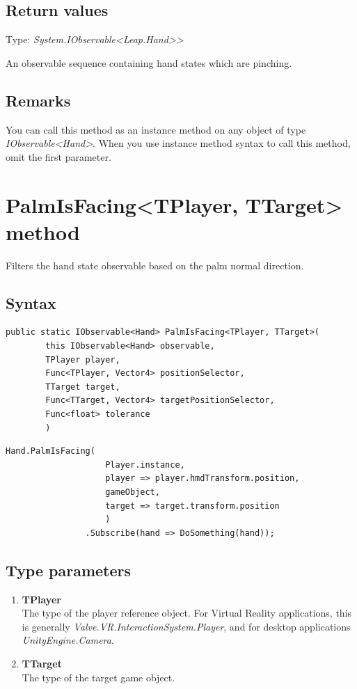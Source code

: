 \documentclass[12pt,a4paper,twoside]{report}
\begin{document}
\subsection{Return values}
Type: \textit{System.IObservable<Leap.Hand>{}>}

An observable sequence containing hand states which are pinching.

\subsection{Remarks}
You can call this method as an instance method on any object of type \textit{IObservable<Hand>}. When you use 
instance method syntax to call this method, omit the first parameter.

\section{PalmIsFacing<TPlayer, TTarget> method}
Filters the hand state observable based on the palm normal direction.

\subsection{Syntax}
\begin{lstlisting}[caption=Declaration]
    public static IObservable<Hand> PalmIsFacing<TPlayer, TTarget>(
        this IObservable<Hand> observable,
        TPlayer player,
        Func<TPlayer, Vector4> positionSelector,
        TTarget target,
        Func<TTarget, Vector4> targetPositionSelector,
        Func<float> tolerance
        )
\end{lstlisting}
\begin{lstlisting}[caption=Usage example]
    Hand.PalmIsFacing(
                    Player.instance,
                    player => player.hmdTransform.position,
                    gameObject,
                    target => target.transform.position
                    )
                .Subscribe(hand => DoSomething(hand));
\end{lstlisting}

\subsection{Type parameters}
\begin{enumerate}
    \item \textbf{TPlayer}\\
        The type of the player reference object. For Virtual Reality applications, this is generally \textit{Valve.VR.InteractionSystem.Player}, and for desktop applications \textit{UnityEngine.Camera}.
        
    \item \textbf{TTarget}\\
        The type of the target game object.
\end{enumerate}
\end{document}
